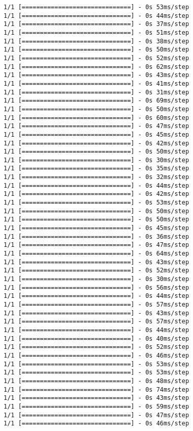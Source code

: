 \documentclass[11pt]{article}
\begin{document}
\begin{Verbatim}[commandchars=\\\{\}]
1/1 [==============================] - 0s 53ms/step
1/1 [==============================] - 0s 44ms/step
1/1 [==============================] - 0s 37ms/step
1/1 [==============================] - 0s 51ms/step
1/1 [==============================] - 0s 38ms/step
1/1 [==============================] - 0s 50ms/step
1/1 [==============================] - 0s 52ms/step
1/1 [==============================] - 0s 62ms/step
1/1 [==============================] - 0s 43ms/step
1/1 [==============================] - 0s 41ms/step
1/1 [==============================] - 0s 31ms/step
1/1 [==============================] - 0s 69ms/step
1/1 [==============================] - 0s 50ms/step
1/1 [==============================] - 0s 60ms/step
1/1 [==============================] - 0s 47ms/step
1/1 [==============================] - 0s 45ms/step
1/1 [==============================] - 0s 42ms/step
1/1 [==============================] - 0s 50ms/step
1/1 [==============================] - 0s 30ms/step
1/1 [==============================] - 0s 35ms/step
1/1 [==============================] - 0s 32ms/step
1/1 [==============================] - 0s 44ms/step
1/1 [==============================] - 0s 42ms/step
1/1 [==============================] - 0s 53ms/step
1/1 [==============================] - 0s 50ms/step
1/1 [==============================] - 0s 50ms/step
1/1 [==============================] - 0s 45ms/step
1/1 [==============================] - 0s 36ms/step
1/1 [==============================] - 0s 47ms/step
1/1 [==============================] - 0s 64ms/step
1/1 [==============================] - 0s 43ms/step
1/1 [==============================] - 0s 52ms/step
1/1 [==============================] - 0s 30ms/step
1/1 [==============================] - 0s 56ms/step
1/1 [==============================] - 0s 44ms/step
1/1 [==============================] - 0s 57ms/step
1/1 [==============================] - 0s 43ms/step
1/1 [==============================] - 0s 57ms/step
1/1 [==============================] - 0s 44ms/step
1/1 [==============================] - 0s 40ms/step
1/1 [==============================] - 0s 52ms/step
1/1 [==============================] - 0s 46ms/step
1/1 [==============================] - 0s 53ms/step
1/1 [==============================] - 0s 53ms/step
1/1 [==============================] - 0s 48ms/step
1/1 [==============================] - 0s 74ms/step
1/1 [==============================] - 0s 43ms/step
1/1 [==============================] - 0s 59ms/step
1/1 [==============================] - 0s 47ms/step
1/1 [==============================] - 0s 46ms/step

\end{Verbatim}
\end{document}
